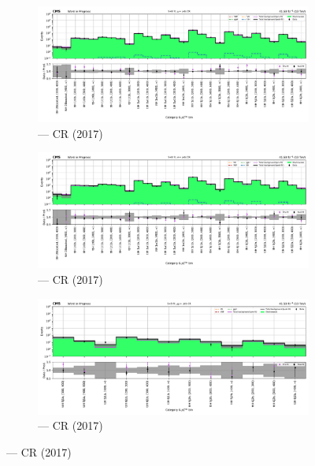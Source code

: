 \begin{figure}[htbp]
    \centering
    \begin{subfigure}[b]{0.65\textwidth}
        \includegraphics[width=\textwidth]{chapters/higgstoinv/figures/mountain_ranges/2017/ttH/Wmunu_tree_fit_s-abs_values_ttH_cats.pdf}
        \caption{\ttH --- \singleMuCr \gls{CR} (2017)}
    \end{subfigure}

    \begin{subfigure}[b]{0.65\textwidth}
        \includegraphics[width=\textwidth]{chapters/higgstoinv/figures/mountain_ranges/2017/ttH/Wenu_tree_fit_s-abs_values_ttH_cats.pdf}
        \caption{\ttH --- \singleEleCr \gls{CR} (2017)}
    \end{subfigure}

    \begin{subfigure}[b]{0.65\textwidth}
        \includegraphics[width=\textwidth]{chapters/higgstoinv/figures/mountain_ranges/2017/ttH/Zmumu_tree_fit_s-abs_values_ttH_cats.pdf}
        \caption{\ttH --- \doubleMuCr \gls{CR} (2017)}
    \end{subfigure}


\end{figure}
